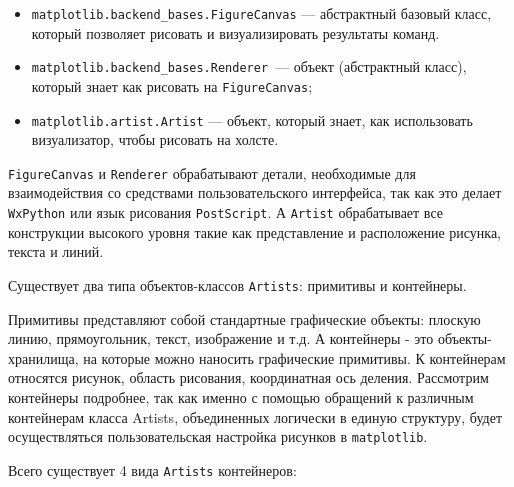 \begin{itemize}
	\item  \lstinline!matplotlib.backend_bases.FigureCanvas! — абстрактный базовый класс, который позволяет рисовать и визуализировать результаты команд.
	\item  \lstinline!matplotlib.backend_bases.Renderer !— объект (абстрактный класс), который знает как рисовать на \lstinline!FigureCanvas!;
	\item  \lstinline!matplotlib.artist.Artist! — объект, который знает, как использовать визуализатор, чтобы рисовать на холсте.
\end{itemize}


\lstinline!FigureCanvas! и \lstinline!Renderer! обрабатывают детали, необходимые для взаимодействия со средствами пользовательского интерфейса, так как это делает \lstinline!WxPython! или язык рисования \lstinline!PostScript!. А \lstinline!Artist! обрабатывает все конструкции высокого уровня такие как представление и расположение рисунка, текста и линий.

Существует два типа объектов-классов \lstinline!Artists!: примитивы и контейнеры.

Примитивы представляют собой стандартные графические объекты: плоскую линию, прямоугольник, текст, изображение и т.д. А контейнеры - это объекты-хранилища, на которые можно наносить графические примитивы. К контейнерам относятся рисунок, область рисования, координатная ось деления. Рассмотрим контейнеры подробнее, так как именно с помощью обращений к различным контейнерам класса Artists, объединенных логически в единую структуру, будет осуществляться пользовательская настройка рисунков в \lstinline!matplotlib!.

Всего существует 4 вида \lstinline!Artists! контейнеров:

